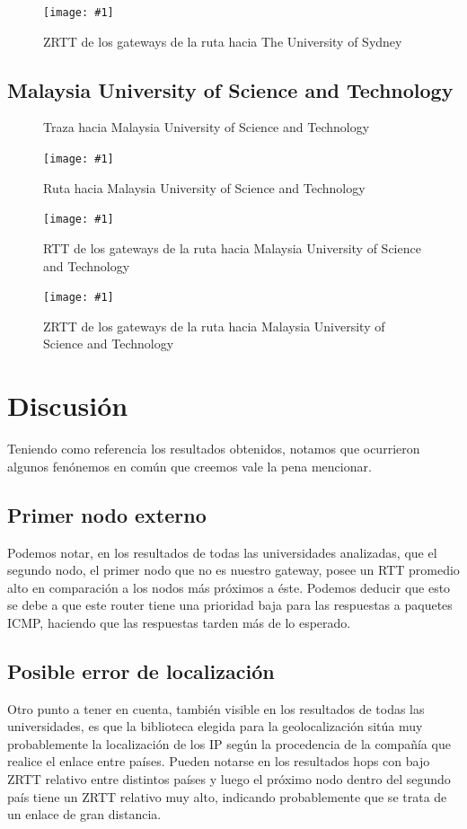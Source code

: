 \documentclass[a4paper, 10pt, twoside]{article}
\newcommand{\estadisticas}[3]{
  \begin{figure}[H]
    \small
    
    \normalsize
    \caption{#2}
    \label{#3}
  \end{figure}
}
\newcommand{\grafico}[3]{
  \begin{figure}[H]
    \texttt{[image: \#1]}
    \caption{#2}
    \label{#3}
  \end{figure}
}
\newcommand{\sydney}{The University of Sydney}
\newcommand{\must}{Malaysia University of Science and Technology}
\begin{document}
\grafico{zrtt-www.sydney.edu.au}
        {ZRTT de los gateways de la ruta hacia \sydney}
        {fig:zrtt-sydney}


\subsection{\must}

\estadisticas{statistics-www.must.edu.my.txt}
             {Traza hacia \must}
             {fig:trace-must}

\grafico{map-www.must.edu.my}
        {Ruta hacia \must}
        {fig:map-must}

\grafico{rtt-www.must.edu.my}
        {RTT de los gateways de la ruta hacia \must}
        {fig:rtt-must}

\grafico{zrtt-www.must.edu.my}
        {ZRTT de los gateways de la ruta hacia \must}
        {fig:zrtt-must}




\section{Discusión}

Teniendo como referencia los resultados obtenidos, notamos que ocurrieron algunos fenónemos en común que creemos vale la pena mencionar.

\subsection{Primer nodo externo}
Podemos notar, en los resultados de todas las universidades analizadas, que el segundo nodo, el primer nodo que no es nuestro gateway, posee un RTT promedio alto en comparación a los nodos más próximos a éste. Podemos deducir que esto se debe a que este router tiene una prioridad baja para las respuestas a paquetes ICMP, haciendo que las respuestas tarden más de lo esperado.

\subsection{Posible error de localización}
Otro punto a tener en cuenta, también visible en los resultados de todas las universidades, es que la biblioteca elegida para la geolocalización sitúa muy probablemente la localización de los IP según la procedencia de la compañía que realice el enlace entre países. Pueden notarse en los resultados hops con bajo ZRTT relativo entre distintos países y luego el próximo nodo dentro del segundo país tiene un ZRTT relativo muy alto, indicando probablemente que se trata de un enlace de gran distancia.
\end{document}
